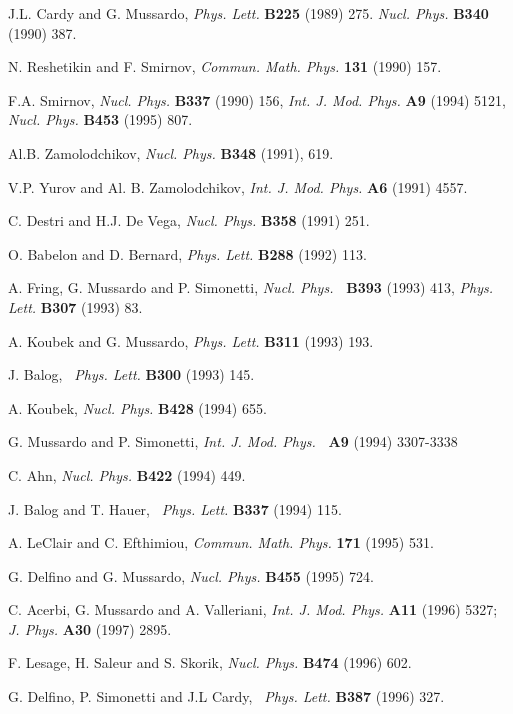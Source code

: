 \documentclass[a4paper,12pt]{article}
\begin{document}
\begin{thebibliography}{99}
  J.L. Cardy and G. Mussardo, \emph{Phys. Lett.} \textbf{B225}
(1989) 275. \emph{Nucl. Phys.} \textbf{B340} (1990) 387.

  N. Reshetikin and F. Smirnov, \emph{Commun. Math. Phys. } 
\textbf{131} (1990) 157.

  F.A. Smirnov, \emph{Nucl. Phys.} \textbf{B337} (1990)
156, \emph{Int. J. Mod. Phys.} \textbf{A9} (1994) 5121, \emph{Nucl. Phys.} 
\textbf{B453} (1995) 807.

  Al.B. Zamolodchikov, \emph{Nucl. Phys.} \textbf{B348}
(1991), 619.

  V.P. Yurov and Al. B. Zamolodchikov, \emph{Int. J. Mod. Phys.} 
\textbf{A6} (1991) 4557.

  C. Destri and H.J. De Vega, \emph{Nucl. Phys.} \textbf{B358}
(1991) 251.

  O. Babelon and D. Bernard, \emph{Phys. Lett.} \textbf{B288}
(1992) 113.

  A. Fring, G. Mussardo and P. Simonetti,  \emph{Nucl. Phys.}%
\textbf{\ B393} (1993) 413, \emph{Phys. Lett.} \textbf{B307} (1993) 83.

  A. Koubek and G. Mussardo, \emph{Phys. Lett.} \textbf{B311}
(1993) 193.

  J. Balog, \emph{\ Phys. Lett.} \textbf{B300} (1993) 145.

  A. Koubek, \emph{Nucl. Phys.} \textbf{B428} (1994) 655.

  G. Mussardo and P. Simonetti, \emph{Int. J. Mod. Phys.}\textbf{%
\ A9} (1994) 3307-3338

  C. Ahn, \emph{Nucl. Phys.} \textbf{B422} (1994) 449.

  J. Balog and T. Hauer, \emph{\ Phys. Lett.} \textbf{B337}
(1994) 115.

  A. LeClair and C. Efthimiou, \emph{Commun. Math. Phys. } 
\textbf{171} (1995) 531.

  G. Delfino and G. Mussardo, \emph{Nucl. Phys.} \textbf{B455}
(1995) 724.

  C. Acerbi, G. Mussardo and A. Valleriani, \emph{Int. J. Mod.
Phys.} \textbf{A11} (1996) 5327; \emph{J. Phys.} \textbf{A30} (1997) 2895.

  F. Lesage, H. Saleur and S. Skorik, \emph{Nucl. Phys.} 
\textbf{B474} (1996) 602.

  G. Delfino, P. Simonetti and J.L Cardy, \emph{\ Phys. Lett.} 
\textbf{B387} (1996) 327.


\end{thebibliography}
\end{document}
